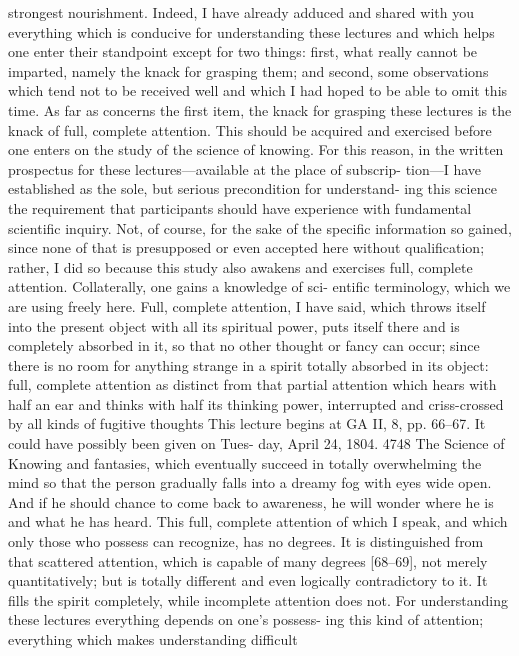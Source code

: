strongest nourishment.
Indeed, I have already adduced and shared with you everything which
is conducive for understanding these lectures and which helps one enter their
standpoint except for two things: first, what really cannot be imparted, namely
the knack for grasping them; and second, some observations which tend not
to be received well and which I had hoped to be able to omit this time.
As far as concerns the first item, the knack for grasping these lectures is
the knack of full, complete attention. This should be acquired and exercised
before one enters on the study of the science of knowing. For this reason, in
the written prospectus for these lectures—available at the place of subscrip-
tion—I have established as the sole, but serious precondition for understand-
ing this science the requirement that participants should have experience with
fundamental scientific inquiry. Not, of course, for the sake of the specific
information so gained, since none of that is presupposed or even accepted here
without qualification; rather, I did so because this study also awakens and
exercises full, complete attention. Collaterally, one gains a knowledge of sci-
entific terminology, which we are using freely here. Full, complete attention, I
have said, which throws itself into the present object with all its spiritual
power, puts itself there and is completely absorbed in it, so that no other
thought or fancy can occur; since there is no room for anything strange in a
spirit totally absorbed in its object: full, complete attention as distinct from
that partial attention which hears with half an ear and thinks with half its
thinking power, interrupted and criss-crossed by all kinds of fugitive thoughts
This lecture begins at GA II, 8, pp. 66–67. It could have possibly been given on Tues-
day, April 24, 1804.
4748
The Science of Knowing
and fantasies, which eventually succeed in totally overwhelming the mind so
that the person gradually falls into a dreamy fog with eyes wide open. And if
he should chance to come back to awareness, he will wonder where he is and
what he has heard. This full, complete attention of which I speak, and which
only those who possess can recognize, has no degrees. It is distinguished from
that scattered attention, which is capable of many degrees [68–69], not merely
quantitatively; but is totally different and even logically contradictory to it. It
fills the spirit completely, while incomplete attention does not.
For understanding these lectures everything depends on one’s possess-
ing this kind of attention; everything which makes understanding difficult
